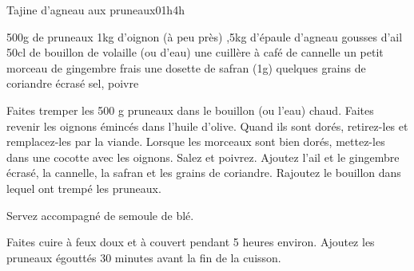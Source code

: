 \begin{recette}{Tajine d'agneau aux pruneaux}{0}{1h}{4h}
\begin{ingredients}
\ingredient 500g de pruneaux
\ingredient 1kg d’oignon (à peu près)
,5kg d’épaule d’agneau
 gousses d'ail
\ingredient 50cl de bouillon de volaille (ou d'eau)
\ingredient une cuillère à café de cannelle
\ingredient un petit morceau de gingembre frais
\ingredient une dosette de safran (1g)
\ingredient quelques grains de coriandre écrasé
\ingredient sel, poivre
\end{ingredients}

\begin{preparation}
\etape Faites tremper les 500 g pruneaux dans le bouillon (ou l'eau) chaud. 
\etape Faites revenir les oignons émincés dans l'huile d'olive. Quand ils sont dorés, retirez-les et remplacez-les par la viande.
\etape Lorsque les morceaux sont bien dorés, mettez-les dans une cocotte avec les oignons. Salez et poivrez. Ajoutez l'ail et le gingembre écrasé, 
la cannelle, la safran et les grains de coriandre.
\etape Rajoutez le bouillon dans lequel ont trempé les pruneaux.
\begin{remarque}
Servez accompagné de semoule de blé.
\end{remarque}
\end{preparation}

\begin{cuisson}
Faites cuire à feux doux et à couvert pendant 5 heures environ. Ajoutez les pruneaux égouttés 30 minutes avant la fin de la
cuisson.
\end{cuisson}

\end{recette}

